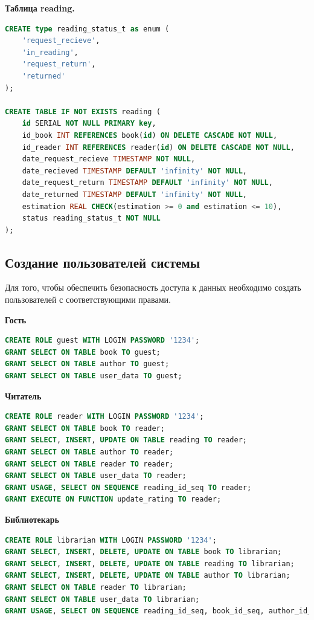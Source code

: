 \textbf{Таблица reading.}
\begin{lstlisting}[label={lst:reading},caption=Создание таблицы reading., language=SQL]
CREATE type reading_status_t as enum (
	'request_recieve',
	'in_reading',
	'request_return',
	'returned'
);

CREATE TABLE IF NOT EXISTS reading (
	id SERIAL NOT NULL PRIMARY key,
	id_book INT REFERENCES book(id) ON DELETE CASCADE NOT NULL,
	id_reader INT REFERENCES reader(id) ON DELETE CASCADE NOT NULL,
	date_request_recieve TIMESTAMP NOT NULL,
	date_recieved TIMESTAMP DEFAULT 'infinity' NOT NULL,
	date_request_return TIMESTAMP DEFAULT 'infinity' NOT NULL,
	date_returned TIMESTAMP DEFAULT 'infinity' NOT NULL,
	estimation REAL CHECK(estimation >= 0 and estimation <= 10),
	status reading_status_t NOT NULL
);
\end{lstlisting}

\subsection{Создание пользователей системы}
Для того, чтобы обеспечить безопасность доступа к данных необходимо создать пользователей с соответствующими правами.

\textbf{Гость}
\begin{lstlisting}[label={lst:guest},caption=Создание пользователя guest., language=SQL]
CREATE ROLE guest WITH LOGIN PASSWORD '1234';
GRANT SELECT ON TABLE book TO guest;
GRANT SELECT ON TABLE author TO guest;
GRANT SELECT ON TABLE user_data TO guest;
\end{lstlisting}

\textbf{Читатель}
\begin{lstlisting}[label={lst:readerRole},caption=Создание пользователя reader., language=SQL]
CREATE ROLE reader WITH LOGIN PASSWORD '1234';
GRANT SELECT ON TABLE book TO reader;
GRANT SELECT, INSERT, UPDATE ON TABLE reading TO reader;
GRANT SELECT ON TABLE author TO reader;
GRANT SELECT ON TABLE reader TO reader;
GRANT SELECT ON TABLE user_data TO reader;
GRANT USAGE, SELECT ON SEQUENCE reading_id_seq TO reader;
GRANT EXECUTE ON FUNCTION update_rating TO reader;
\end{lstlisting}

\textbf{Библиотекарь}
\begin{lstlisting}[label={lst:librarian},caption=Создание пользователя librarian., language=SQL]
CREATE ROLE librarian WITH LOGIN PASSWORD '1234';
GRANT SELECT, INSERT, DELETE, UPDATE ON TABLE book TO librarian;
GRANT SELECT, INSERT, DELETE, UPDATE ON TABLE reading TO librarian;
GRANT SELECT, INSERT, DELETE, UPDATE ON TABLE author TO librarian;
GRANT SELECT ON TABLE reader TO librarian;
GRANT SELECT ON TABLE user_data TO librarian;
GRANT USAGE, SELECT ON SEQUENCE reading_id_seq, book_id_seq, author_id_seq TO librarian;
\end{lstlisting}

